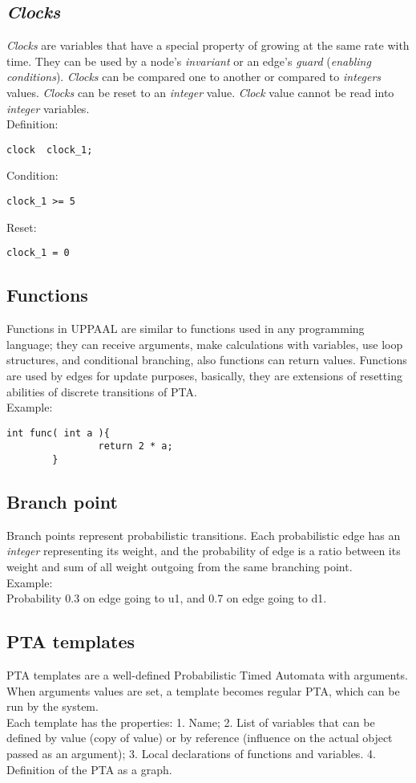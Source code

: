 \subsection{\textit{Clocks}}
\textit{Clocks} are variables that have a special property of growing at the same rate with time. They can be used by a node’s \textit{invariant} or an edge’s \textit{guard} (\textit{enabling conditions}). \textit{Clocks} can be compared one to another or compared to \textit{integers} values. \textit{Clocks} can be reset to an \textit{integer} value. \textit{Clock} value cannot be read into \textit{integer} variables.\\
Definition: \begin{lstlisting}[style=styleuppaal]
        clock  clock_1; \end{lstlisting}
Condition: \begin{lstlisting}[style=styleuppaal]
        clock_1 >= 5 \end{lstlisting}
Reset: \begin{lstlisting}[style=styleuppaal]
        clock_1 = 0 \end{lstlisting}
\subsection{Functions}
Functions in UPPAAL are similar to functions used in any programming language; they can receive arguments, make calculations with variables, use loop structures, and conditional branching, also functions can return values. Functions are used by edges for update purposes, basically, they are extensions of resetting abilities of discrete transitions of PTA.\\
Example:  \begin{lstlisting}[style=styleuppaal]
        int func( int a ){
                return 2 * a;
        }
 \end{lstlisting}
\subsection{Branch point}
Branch points represent probabilistic transitions. Each probabilistic edge has an \textit{integer} representing its weight, and the probability of edge is a ratio between its weight and sum of all weight outgoing from the same branching point.\\
Example: \\
        Probability 0.3 on edge going to u1, and 0.7 on edge going to d1.  \subsection{PTA templates}
PTA templates are a well-defined Probabilistic Timed Automata with arguments. When arguments values are set, a template becomes regular PTA, which can be run by the system.\\
Each template has the properties: 1. Name; 2. List of variables that can be defined by value (copy of value) or by reference (influence on the actual object passed as an argument); 3. Local declarations of functions and variables. 4. Definition of the PTA as a graph.\\
